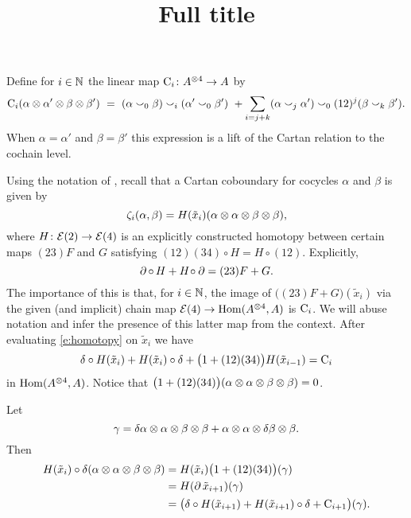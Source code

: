 \documentclass{amsart}
\title[Short title]{Full title}
\begin{document}
\thispagestyle{empty}
Define for $i \in \mathbb{N}$ the linear map $\mathrm{C}_i \colon A^{\otimes 4} \to A$ by
\[
\rC_i(\alpha \ot \alpha' \ot \beta \ot \beta') \ =\
(\alpha \cup_0 \beta) \cup_i (\alpha' \cup_0 \beta') \ +
\sum_{i=j+k} (\alpha \cup_j \alpha') \cup_0 (12)^j(\beta \cup_k \beta').
\]
When $\alpha = \alpha'$ and $\beta = \beta'$ this expression is a lift of the Cartan relation to the cochain level.

Using the notation of \cite{medina2020cartan}, recall that a Cartan coboundary for cocycles $\alpha$ and $\beta$ is given by
\[
\zeta_i(\alpha,\beta) = H(\tilde x_i)(\alpha \otimes \alpha \otimes \beta \otimes \beta),
\]
where $H \colon \mathcal{E}(2) \to \mathcal{E}(4)$ is an explicitly constructed homotopy between certain maps $(23)F$ and $G$ satisfying $(12)(34) \circ H = H \circ (12)$.
Explicitly,
\begin{equation}\label{e:homotopy}
	\operatorname{\partial} \circ \, H + H \! \circ \operatorname{\partial} = (23)F + G.
\end{equation}
The importance of this is that, for $i\in\mathbb{N}$, the image of $\big((23)F + G\big)(\tilde{x}_i)$ via the given (and implicit) chain map $\mathcal{E}(4) \to \mathrm{Hom}(A^{\otimes 4}, A)$ is $\mathrm{C}_i$.
We will abuse notation and infer the presence of this latter map from the context.
After evaluating \cref{e:homotopy} on $\tilde x_i$ we have
\begin{equation}\label{e:homotopy evaluated}
	\delta \circ H(\tilde x_i) + H(\tilde x_i) \circ \delta + \big(1+(12)(34)\big) H(\tilde x_{i-1}) = \mathrm{C}_i
\end{equation}
in $\mathrm{Hom}(A^{\otimes 4}, A)$.
Notice that $\big(1+(12)(34)\big)(\alpha \otimes \alpha \otimes \beta \otimes \beta) = 0$.

Let
\[
\gamma = \delta\alpha \otimes \alpha \otimes \beta \otimes \beta + \alpha \otimes \alpha \otimes \delta\beta \otimes \beta.
\]
Then
\begin{equation}
\begin{split}
	H(\tilde x_i) \circ \delta (\alpha \otimes \alpha \otimes \beta \otimes \beta) & =
	H(\tilde x_i) \big(1 + (12)(34)\big)(\gamma) \\ & =
	H (\operatorname{\partial} \tilde x_{i+1})(\gamma) \\ & =
	\big(\delta \circ H(\tilde x_{i+1}) + H(\tilde x_{i+1}) \circ \delta + \mathrm{C}_{i+1}\big) (\gamma).
\end{split}
\end{equation}
\end{document}
